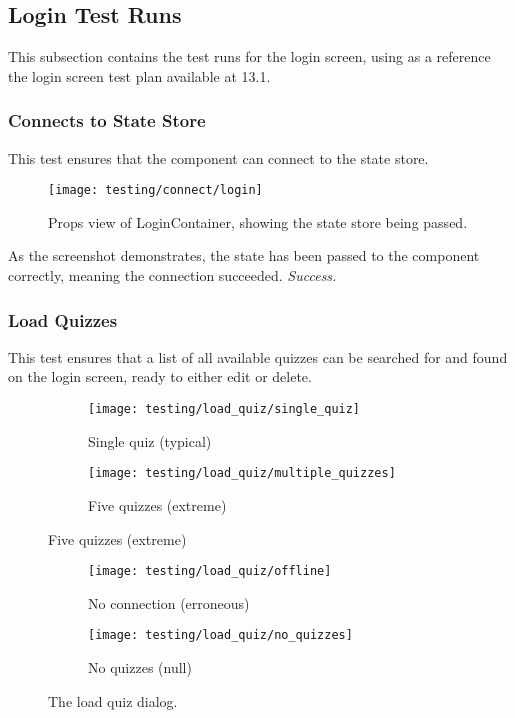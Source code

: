\subsection{Login Test Runs}
This subsection contains the test runs for the login screen, using as a reference the login screen test plan available at 13.1.

\subsubsection{Connects to State Store} %
\label{ssub:connects_to_state_store}
This test ensures that the component can connect to the state store.
\begin{figure}[h!]
  \texttt{[image: testing/connect/login]}
  \caption{Props view of LoginContainer, showing the state store being passed.}
\end{figure}
As the screenshot demonstrates, the state has been passed to the component correctly, meaning the connection succeeded. \textit{Success.}

\subsubsection{Load Quizzes}
This test ensures that a list of all available quizzes can be searched for and found on the login screen, ready to either edit or delete.
\begin{figure}[!htbp]
\centering
\begin{subfigure}{0.5\textwidth}
  \centering
  \texttt{[image: testing/load\_quiz/single\_quiz]}
  \caption{Single quiz (typical)}
  \label{fig:sub1}
\end{subfigure}%
\begin{subfigure}{0.5\textwidth}
  \centering
  \texttt{[image: testing/load\_quiz/multiple\_quizzes]}
  \caption{Five quizzes (extreme)}
  \label{fig:sub2}
\end{subfigure}
\label{fig:test}
\end{figure}

\begin{figure}[!htbp]
\centering
\begin{subfigure}{0.5\textwidth}
  \centering
  \texttt{[image: testing/load\_quiz/offline]}
  \setcounter{subfigure}{2}%
  \caption{No connection (erroneous)}
  \label{fig:sub1}
\end{subfigure}%
\begin{subfigure}{0.5\textwidth}
  \centering
  \texttt{[image: testing/load\_quiz/no\_quizzes]}
  \setcounter{subfigure}{3}%
  \caption{No quizzes (null)}
  \label{fig:sub2}
\end{subfigure}
\caption{The load quiz dialog.}
\label{fig:test}
\end{figure}

